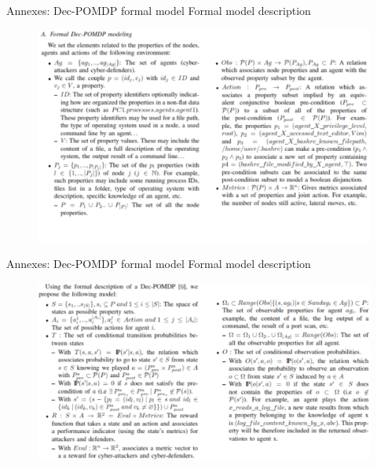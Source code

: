         \begin{frame}{Annexes: Dec-POMDP formal model}
            {Formal model description}

            \begin{figure}
                \centering
                \includegraphics[scale=0.3]{figures/formal_description_1.png}
            \end{figure}

        \end{frame}

        \begin{frame}{Annexes: Dec-POMDP formal model}
            {Formal model description}

            \begin{figure}
                \centering
                \includegraphics[scale=0.3]{figures/formal_description_2.png}
            \end{figure}

        \end{frame}
    
        
